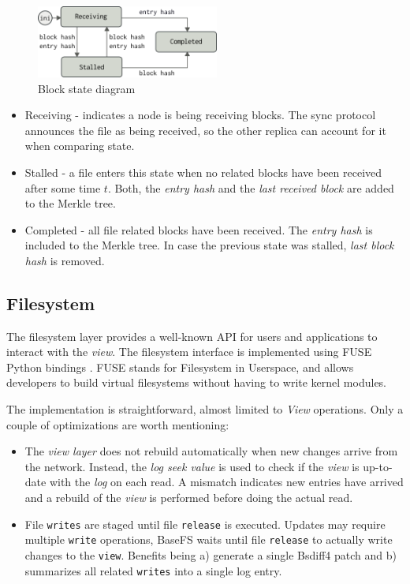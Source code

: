 \documentclass{sig-alternate}
\begin{document}
\begin{figure}
\centering
\includegraphics[width=170pt]{imgs/blockstate.png}
\caption{Block state diagram}
\label{fig:blockstate}
\end{figure}


\begin{itemize}
\item Receiving - indicates a node is being receiving blocks. The sync protocol announces the file as being received, so the other replica can account for it when comparing state.
\item Stalled - a file enters this state when no related blocks have been received after some time $t$. Both, the \textit{entry hash} and the \textit{last received block} are added to the Merkle tree.
\item Completed - all file related blocks have been received. The \textit{entry hash} is included to the Merkle tree. In case the previous state was stalled, \textit{last block hash} is removed.
\end{itemize}


\subsection{Filesystem}\label{filesystem}
The filesystem layer provides a well-known API for users and applications to interact with the \textit{view}. The filesystem interface is implemented using FUSE Python bindings \cite{fusepy}. FUSE stands for Filesystem in Userspace, and allows developers to build virtual filesystems without having to write kernel modules.

The implementation is straightforward, almost limited to \textit{View} operations. Only a couple of optimizations are worth mentioning:

\begin{itemize}
 \item The \textit{view layer} does not rebuild automatically when new changes arrive from the network. Instead, the \textit{log seek value} is used to check if the \textit{view} is up-to-date with the \textit{log} on each read. A mismatch indicates new entries have arrived and a rebuild of the \textit{view} is performed before doing the actual read.
 \item File \texttt{writes} are staged until file \texttt{release} is executed. Updates may require multiple \texttt{write} operations, BaseFS waits until file \texttt{release} to actually write changes to the \texttt{view}. Benefits being a) generate a single Bsdiff4 patch and b) summarizes all related \texttt{writes} into a single log entry.
\end{itemize}
\end{document}
